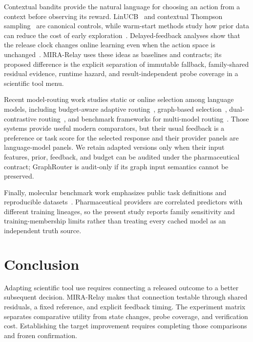 \documentclass[sigconf,anonymous]{aamas}
\begin{document}
Contextual bandits provide the natural language for choosing an action from a context before observing its reward. LinUCB~\cite{li2010contextual} and contextual Thompson sampling~\cite{agrawal2013thompson} are canonical controls, while warm-start methods study how prior data can reduce the cost of early exploration~\cite{oetomo2023warmstart}. Delayed-feedback analyses show that the release clock changes online learning even when the action space is unchanged~\cite{joulani2013online}. MIRA-Relay uses these ideas as baselines and contracts; its proposed difference is the explicit separation of immutable fallback, family-shared residual evidence, runtime hazard, and result-independent probe coverage in a scientific tool menu.

Recent model-routing work studies static or online selection among language models, including budget-aware adaptive routing~\cite{panda2025pilot}, graph-based selection~\cite{feng2025graphrouter}, dual-contrastive routing~\cite{chen2024routerdc}, and benchmark frameworks for multi-model routing~\cite{hu2024routerbench}. Those systems provide useful modern comparators, but their usual feedback is a preference or task score for the selected response and their provider panels are language-model panels. We retain adapted versions only when their input features, prior, feedback, and budget can be audited under the pharmaceutical contract; GraphRouter is audit-only if its graph input semantics cannot be preserved.

Finally, molecular benchmark work emphasizes public task definitions and reproducible datasets~\cite{huang2021tdc,wu2018moleculenet}. Pharmaceutical providers are correlated predictors with different training lineages, so the present study reports family sensitivity and training-membership limits rather than treating every cached model as an independent truth source.

\section{Conclusion}
Adapting scientific tool use requires connecting a released outcome to a better subsequent decision. MIRA-Relay makes that connection testable through shared residuals, a fixed reference, and explicit feedback timing. The experiment matrix separates comparative utility from state changes, probe coverage, and verification cost. Establishing the target improvement requires completing those comparisons and frozen confirmation.

\balance


\end{document}
